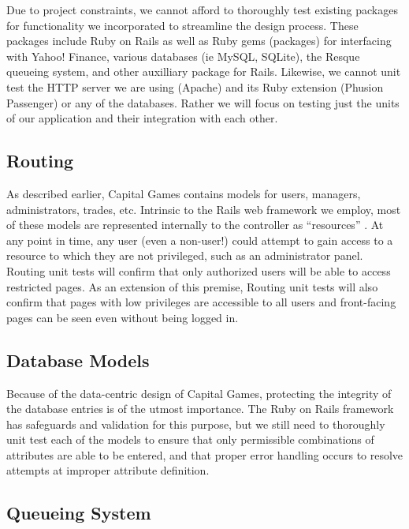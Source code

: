 Due to project constraints, we cannot afford to thoroughly
test existing packages for functionality we incorporated to
streamline the design process. These packages include Ruby
on Rails
as well as Ruby gems (packages) for interfacing with Yahoo! Finance,
various databases (ie MySQL, SQLite), the Resque queueing system,
and other auxilliary package for Rails. Likewise, we
cannot unit test
the HTTP server we are using (Apache) and its Ruby 
extension (Phusion Passenger) or any of the databases. Rather
we will focus on testing just the units of our application and
their integration with each other.

\subsection{Routing}

As described earlier, Capital Games contains models for
users, managers, administrators, trades, etc. Intrinsic to the Rails web framework
we employ, most of these models are represented internally to the 
controller as ``resources'' \cite{guides:routing}. At any
point in time, any user (even a non-user!) could attempt to gain
access to a resource to which they are not privileged, such as an
administrator panel. Routing unit tests will confirm that only
authorized users will be able to access restricted pages. As an
extension of this premise, Routing unit tests will also confirm
that pages with low privileges are accessible to all users and
front-facing pages can be seen even without being logged in.

\subsection{Database Models}

Because of the data-centric design of Capital Games, protecting 
the integrity of the database entries is of the utmost importance. 
The Ruby on Rails framework has safeguards and validation for this 
purpose, but we still need to thoroughly unit test each of the 
models to ensure that only permissible combinations of attributes 
are able to be entered, and that proper error handling occurs to 
resolve attempts at improper attribute definition.

\subsection{Queueing System}


